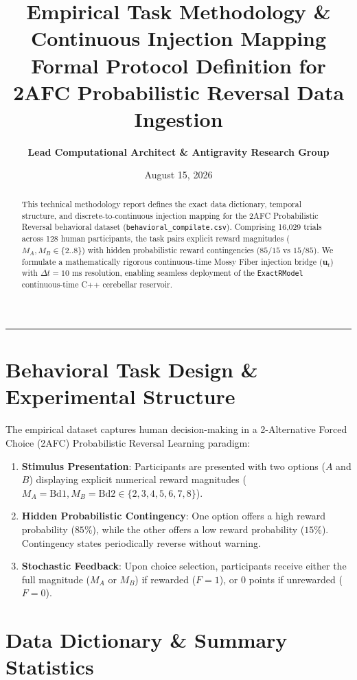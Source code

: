 \documentclass[11pt,a4paper]{article}
\title{\Huge \textbf{\color{navyblue} Empirical Task Methodology \& Continuous Injection Mapping}\\[0.4em]
\large Formal Protocol Definition for 2AFC Probabilistic Reversal Data Ingestion}
\author{\textbf{Lead Computational Architect \& Antigravity Research Group}}
\date{August 15, 2026}
\begin{document}
\maketitle

\begin{abstract}
This technical methodology report defines the exact data dictionary, temporal structure, and discrete-to-continuous injection mapping for the 2AFC Probabilistic Reversal behavioral dataset (\texttt{behavioral\_compilate.csv}). Comprising 16,029 trials across 128 human participants, the task pairs explicit reward magnitudes ($M_A, M_B \in \{2..8\}$) with hidden probabilistic reward contingencies ($85/15$ vs $15/85$). We formulate a mathematically rigorous continuous-time Mossy Fiber injection bridge ($\mathbf{u}_t$) with $\Delta t = 10\text{ ms}$ resolution, enabling seamless deployment of the \texttt{ExactRModel} continuous-time C++ cerebellar reservoir.
\end{abstract}

\vspace{0.8em}
\hrule
\vspace{0.8em}

\section{Behavioral Task Design \& Experimental Structure}

The empirical dataset captures human decision-making in a 2-Alternative Forced Choice (2AFC) Probabilistic Reversal Learning paradigm:
\begin{enumerate}
    \item \textbf{Stimulus Presentation}: Participants are presented with two options ($A$ and $B$) displaying explicit numerical reward magnitudes ($M_A = \text{Bd1}, M_B = \text{Bd2} \in \{2, 3, 4, 5, 6, 7, 8\}$).
    \item \textbf{Hidden Probabilistic Contingency}: One option offers a high reward probability ($85\%$), while the other offers a low reward probability ($15\%$). Contingency states periodically reverse without warning.
    \item \textbf{Stochastic Feedback}: Upon choice selection, participants receive either the full magnitude ($M_A$ or $M_B$) if rewarded ($F = 1$), or $0$ points if unrewarded ($F = 0$).
\end{enumerate}

\section{Data Dictionary \& Summary Statistics}
\end{document}
